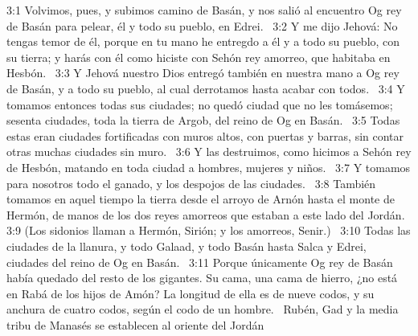 3:1 Volvimos, pues, y subimos camino de Basán, y nos salió al encuentro Og rey de Basán para pelear, él y todo su pueblo, en Edrei.  
3:2 Y me dijo Jehová: No tengas temor de él, porque en tu mano he entregdo a él y a todo su pueblo, con su tierra; y harás con él como hiciste con Sehón rey amorreo, que habitaba en Hesbón.  
3:3 Y Jehová nuestro Dios entregó también en nuestra mano a Og rey de Basán, y a todo su pueblo, al cual derrotamos hasta acabar con todos.  
3:4 Y tomamos entonces todas sus ciudades; no quedó ciudad que no les tomásemos; sesenta ciudades, toda la tierra de Argob, del reino de Og en Basán.  
3:5 Todas estas eran ciudades fortificadas con muros altos, con puertas y barras, sin contar otras muchas ciudades sin muro.  
3:6 Y las destruimos, como hicimos a Sehón rey de Hesbón, matando en toda ciudad a hombres, mujeres y niños.  
3:7 Y tomamos para nosotros todo el ganado, y los despojos de las ciudades.  
3:8 También tomamos en aquel tiempo la tierra desde el arroyo de Arnón hasta el monte de Hermón, de manos de los dos reyes amorreos que estaban a este lado del Jordán.  
3:9 (Los sidonios llaman a Hermón, Sirión; y los amorreos, Senir.)  
3:10 Todas las ciudades de la llanura, y todo Galaad, y todo Basán hasta Salca y Edrei, ciudades del reino de Og en Basán.  
3:11 Porque únicamente Og rey de Basán había quedado del resto de los gigantes. Su cama, una cama de hierro, ¿no está en Rabá de los hijos de Amón? La longitud de ella es de nueve codos, y su anchura de cuatro codos, según el codo de un hombre.  
Rubén, Gad y la media tribu de Manasés se establecen al oriente del Jordán  

